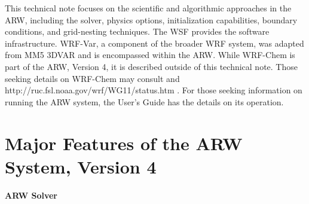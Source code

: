 This technical note focuses on the scientific and algorithmic 
approaches in the ARW, including the solver, physics options,
initialization capabilities, boundary conditions, and grid-nesting techniques.  
The WSF provides the software infrastructure.  
WRF-Var, a component of the broader WRF system, was  
adapted from MM5 3DVAR \citep{barker04} and is encompassed within the ARW.
While WRF-Chem is part of the ARW, Version 4, it is described 
outside of this technical note.  Those seeking details on 
WRF-Chem may consult \citet{Grelletal05} and 
http://ruc.fsl.noaa.gov/wrf/WG11/status.htm . 
For those seeking information on running the ARW system, 
the {\wrf} User's Guide \citep{wang08} 
has the details on its operation. 

\section {Major Features of the ARW System, Version 4}

\vskip 12pt
{\noindent\bf ARW Solver}
\vskip 12pt

